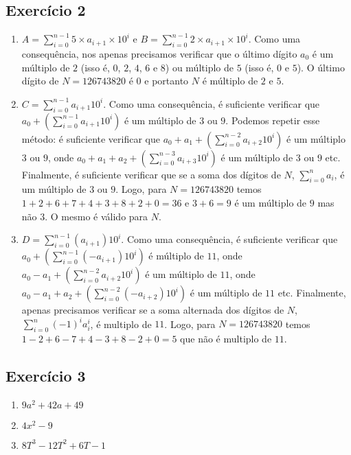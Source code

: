 \subsection*{Exercício 2}

\begin{enumerate}
\item $A = \sum_{i=0}^{n-1} {5 \times a_{i+1} \times 10^i}$ e
  $B = \sum_{i=0}^{n-1} {2 \times a_{i+1} \times 10^i}$. Como uma consequência,
  nos apenas precisamos verificar que o último dígito $a_0$ é um múltiplo de $2$
  (isso é, $0$, $2$, $4$, $6$ e $8$) ou múltiplo de $5$ (isso é, $0$ e $5$).
  O último dígito de $N=126743820$ é $0$ e portanto $N$ é múltiplo de $2$ e $5$.

\item $C =\sum_{i=0}^{n-1} {a_{i+1} 10^i}$. Como uma consequência, é suficiente
  verificar que $a_0 + \left(\sum_{i=0}^{n-1} a_{i+1} 10^i\right)$ é um múltiplo
  de $3$ ou $9$. Podemos repetir esse método: é suficiente verificar que
  $a_0 + a_1 + \left(\sum_{i=0}^{n-2} a_{i+2} 10^i\right)$ é um múltiplo $3$ ou
  $9$, onde $a_0 + a_1 + a_2 + \left(\sum_{i=0}^{n-3} a_{i+3} 10^i\right)$ é um
  múltiplo de $3$ ou $9$ etc. Finalmente, é suficiente verificar que se a soma
  dos dígitos de $N$, $\sum_{i=0}^n a_i$, é um múltiplo de $3$ ou $9$. Logo, para
  $N=126743820$ temos $1+2+6+7+4+3+8+2+0=36$ e $3+6=9$ é um múltiplo de $9$ mas
  não $3$. O mesmo é válido para $N$.

\item $D = \sum_{i=0}^{n-1} \left(a_{i+1}\right) 10^i$. Como uma consequência, é
  suficiente verificar que
  $a_0 + \left(\sum_{i=0}^{n-1} \left(-a_{i+1}\right) 10^i\right)$ é múltiplo de
  $11$, onde
  $a_0 - a_1 + \left(\sum_{i=0}^{n-2} a_{i+2} 10^i\right)$ é um múltiplo de
  $11$, onde
  $a_0 - a_1 + a_2 + \left(\sum_{i=0}^{n-2} \left(-a_{i+2}\right) 10^i\right)$ é
  um múltiplo de $11$ etc. Finalmente, apenas precisamos verificar se a soma
  alternada dos dígitos de $N$,
  $\sum_{i=0}^n {\left(-1\right)^{i} a_i^i}$, é multiplo de $11$. Logo,
  para $N=126743820$ temos $1-2+6-7+4-3+8-2+0 = 5$ que não é multiplo de $11$.
\end{enumerate}

\subsection*{Exercício 3}

\begin{enumerate}
\item $9a^2 + 42a + 49$
\item $4x^2-9$
\item $8T^3-12T^2+6T-1$
\end{enumerate}

